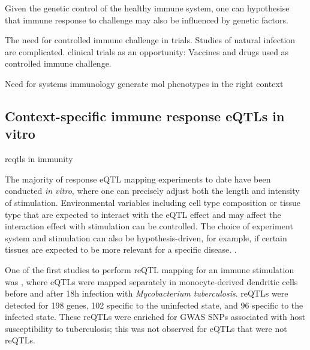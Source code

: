 \begin{outline}
    Given the genetic control of the healthy immune system, one can hypothesise that immune response to challenge may also be influenced by genetic factors.

    The need for controlled immune challenge in trials.
    Studies of natural infection are complicated.
    clinical trials as an opportunity: 
        Vaccines and drugs used as controlled immune challenge.

Need for systems immunology
    generate mol phenotypes 
    in the right context

\subsection{Context-specific immune response eQTLs in vitro}


reqtls in immunity

The majority of response eQTL mapping experiments to date have been conducted \textit{in vitro}, where one can precisely adjust both the length and intensity of stimulation.
Environmental variables including cell type composition or tissue type that are expected to interact with the eQTL effect and may affect the interaction effect with stimulation can be controlled.
The choice of experiment system and stimulation can also be hypothesis-driven, for example, if certain tissues are expected to be more relevant for a specific disease. 
.

One of the first studies to perform \gls{reQTL} mapping for an immune stimulation was \autocite{barreiro2012DecipheringGeneticArchitecture}, where eQTLs were mapped separately in monocyte-derived dendritic cells before and after 18h infection with \textit{Mycobacterium tuberculosis}.
reQTLs were detected for 198 genes, 102 specific to the uninfected state, and 96 specific to the infected state. 
These reQTLs were enriched for GWAS SNPs associated with host susceptibility to tuberculosis; this was not observed for eQTLs that were not reQTLs.


\end{outline}
